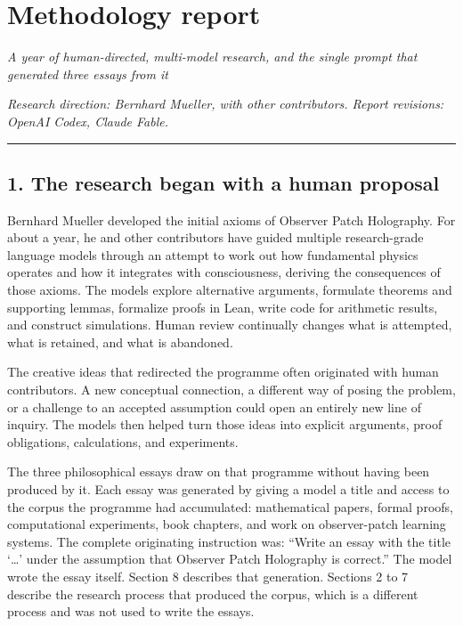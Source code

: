 \documentclass[
  11pt,
]{article}
\author{}
\date{}
\begin{document}
\section{Methodology report}\label{methodology-report}

\emph{A year of human-directed, multi-model research, and the single
prompt that generated three essays from it}

\emph{Research direction: Bernhard Mueller, with other contributors.
Report revisions: OpenAI Codex, Claude Fable.}

\begin{center}\rule{0.5\linewidth}{0.5pt}\end{center}

\subsection{1. The research began with a human
proposal}\label{the-research-began-with-a-human-proposal}

Bernhard Mueller developed the initial axioms of Observer Patch
Holography. For about a year, he and other contributors have guided
multiple research-grade language models through an attempt to work out
how fundamental physics operates and how it integrates with
consciousness, deriving the consequences of those axioms. The models
explore alternative arguments, formulate theorems and supporting lemmas,
formalize proofs in Lean, write code for arithmetic results, and
construct simulations. Human review continually changes what is
attempted, what is retained, and what is abandoned.

The creative ideas that redirected the programme often originated with
human contributors. A new conceptual connection, a different way of
posing the problem, or a challenge to an accepted assumption could open
an entirely new line of inquiry. The models then helped turn those ideas
into explicit arguments, proof obligations, calculations, and
experiments.

The three philosophical essays draw on that programme without having
been produced by it. Each essay was generated by giving a model a title
and access to the corpus the programme had accumulated: mathematical
papers, formal proofs, computational experiments, book chapters, and
work on observer-patch learning systems. The complete originating
instruction was: ``Write an essay with the title `\ldots' under the
assumption that Observer Patch Holography is correct.'' The model wrote
the essay itself. Section 8 describes that generation. Sections 2 to 7
describe the research process that produced the corpus, which is a
different process and was not used to write the essays.
\end{document}

